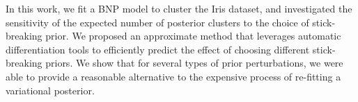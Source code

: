 %
In this work, we fit a BNP model to cluster the Iris dataset, and investigated
the sensitivity of the expected number of posterior clusters to the choice of
stick-breaking prior. We proposed an approximate method that leverages automatic
differentiation tools to efficiently predict the effect of choosing different
stick-breaking priors. We show that for several types of prior perturbations, we
were able to provide a reasonable alternative to the expensive process of
re-fitting a variational posterior.
